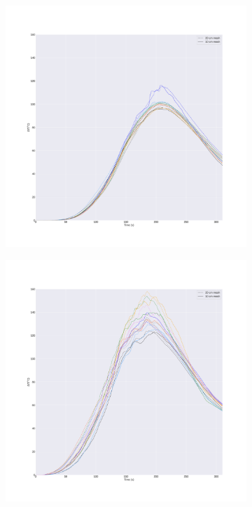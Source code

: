 \documentclass{article}
\begin{document}
\begin{figure}[htbp]
\begin{subfigure}[t]{.45\textwidth}
      \caption{}
      \label{fig:1.07mesh_sensitivity}
  \end{subfigure}
   \begin{subfigure}[t]{.45\textwidth}
      \centering
      \includegraphics[width=\textwidth ,keepaspectratio]{figures/16mesh_sensitivity.pdf}
      \caption{}
      \label{fig:1.6mesh_sensitivity}
  \end{subfigure}
    \begin{subfigure}[t]{.45\textwidth}
      \centering
      \includegraphics[width=\textwidth ,keepaspectratio]{figures/211mesh_sensitivity.pdf}
      \caption{}
      \label{fig:2.11mesh_sensitivity}
  \end{subfigure}
  \caption{} 
  \label{fig:grid_sensitivity}
\end{figure}
\end{document}
